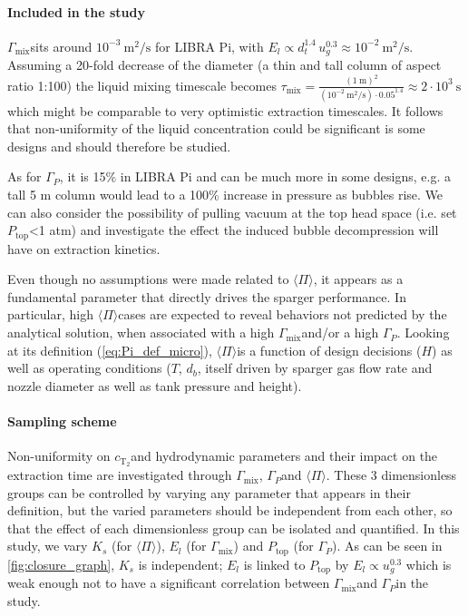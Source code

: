 \documentclass[a4paper,11pt,oneside]{report}
\newcommand{\CT}{\ensuremath{c_\mathrm{T_2}}}
\newcommand{\Gmix}{\ensuremath{\Gamma_\mathrm{mix}}}
\newcommand{\Gp}{\ensuremath{\Gamma_P}}
\newcommand{\PI}{\ensuremath{\langle \Pi \rangle}}
\newcommand{\Ptop}{\ensuremath{P_\mathrm{top}}}
\newcounter{assumption}[chapter]
\begin{document}
\paragraph{Included in the study}

\Gmix sits around $10^{-3} \ \mathrm{m^2/s}$ for LIBRA Pi, with $E_l\propto d_t^{1.4}\,u_g^{0.3} \approx 10^{-2} \ \mathrm{m^2/s}$. Assuming a 20-fold decrease of the diameter (a thin and tall column of aspect ratio 1:100) the liquid mixing timescale becomes $\tau_\mathrm{mix}=\frac{(1 \ \mathrm{m})^2}{(10^{-2} \ \mathrm{m^2/s})\cdot0.05^{1.4}}\approx 2\cdot10^3 \ \mathrm{s}$ which might be comparable to very optimistic extraction timescales. It follows that non-uniformity of the liquid concentration could be significant is some designs and should therefore be studied.  

As for \Gp, it is 15\% in LIBRA Pi and can be much more in some designs, e.g. a tall 5 m column would lead to a 100\% increase in pressure as bubbles rise. We can also consider the possibility of pulling vacuum at the top head space (i.e. set \Ptop<1 atm) and investigate the effect the induced bubble decompression will have on extraction kinetics. 

Even though no assumptions were made related to \PI, it appears as a fundamental parameter that directly drives the sparger performance. In particular, high \PI cases are expected to reveal behaviors not predicted by the analytical solution, when associated with a high \Gmix and/or a high \Gp. Looking at its definition (\cref{eq:Pi_def_micro}), \PI is a function of design decisions ($H$) as well as operating conditions ($T$, $d_b$, itself driven by sparger gas flow rate and nozzle diameter as well as tank pressure and height). 

\paragraph{Sampling scheme}
Non-uniformity on \CT and hydrodynamic parameters and their impact on the extraction time are investigated through \Gmix, \Gp and \PI. These 3 dimensionless groups can be controlled by varying any parameter that appears in their definition, but the varied parameters should be independent from each other, so that the effect of each dimensionless group can be isolated and quantified. In this study, we vary $K_s$ (for \PI), $E_l$ (for \Gmix) and $P_\mathrm{top}$ (for \Gp). As can be seen in \cref{fig:closure_graph}, $K_s$ is independent; $E_l$ is linked to $P_\mathrm{top}$ by $E_l\propto u_g^{0.3}$ which is weak enough not to have a significant correlation between \Gmix and \Gp in the study. 
\end{document}
